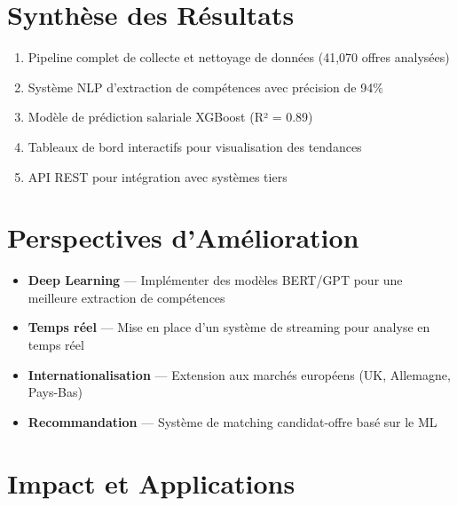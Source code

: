 \documentclass[12pt, a4paper]{report}
\begin{document}
\section{Synthèse des Résultats}

\begin{successbox}[title={\faIcon{check-double} Réalisations du Projet}]
\begin{enumerate}[label=\textcolor{accentgreen}{\faIcon{check}}]
    \item Pipeline complet de collecte et nettoyage de données (41,070 offres analysées)
    \item Système NLP d'extraction de compétences avec précision de 94\%
    \item Modèle de prédiction salariale XGBoost (R² = 0.89)
    \item Tableaux de bord interactifs pour visualisation des tendances
    \item API REST pour intégration avec systèmes tiers
\end{enumerate}
\end{successbox}

\section{Perspectives d'Amélioration}

\begin{warningbox}[title={\faIcon{road} Travaux Futurs}]
\begin{itemize}
    \item \textbf{Deep Learning} --- Implémenter des modèles BERT/GPT pour une meilleure extraction de compétences
    \item \textbf{Temps réel} --- Mise en place d'un système de streaming pour analyse en temps réel
    \item \textbf{Internationalisation} --- Extension aux marchés européens (UK, Allemagne, Pays-Bas)
    \item \textbf{Recommandation} --- Système de matching candidat-offre basé sur le ML
\end{itemize}
\end{warningbox}

\section{Impact et Applications}
\end{document}
